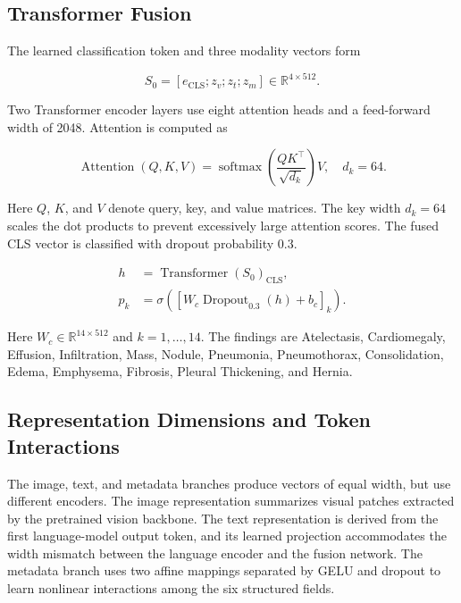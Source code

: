 \documentclass[conference,letterpaper]{IEEEtran}
\begin{document}
\subsection{Transformer Fusion}

The learned classification token and three modality vectors form

\begin{equation}
S_0=[e_{\mathrm{CLS}};z_v;z_t;z_m]
\in\mathbb{R}^{4\times512}.
\end{equation}

Two Transformer encoder layers use eight attention heads and a feed-forward width of 2048. Attention is computed as

\begin{equation}
\operatorname{Attention}(Q,K,V)=
\operatorname{softmax}
\left(\frac{QK^\top}{\sqrt{d_k}}\right)V,
\quad d_k=64.
\end{equation}

Here $Q$, $K$, and $V$ denote query, key, and value matrices. The key width $d_k=64$ scales the dot products to prevent excessively large attention scores. The fused CLS vector is classified with dropout probability 0.3.

\begin{equation}
\begin{aligned}
h &= \operatorname{Transformer}(S_0)_{\mathrm{CLS}},\\
p_k &= \sigma\!\left(
\left[W_c\operatorname{Dropout}_{0.3}(h)+b_c\right]_k
\right).
\end{aligned}
\end{equation}

Here $W_c\in\mathbb{R}^{14\times512}$ and $k=1,\ldots,14$. The findings are Atelectasis, Cardiomegaly, Effusion, Infiltration, Mass, Nodule, Pneumonia, Pneumothorax, Consolidation, Edema, Emphysema, Fibrosis, Pleural Thickening, and Hernia.

\subsection{Representation Dimensions and Token Interactions}

The image, text, and metadata branches produce vectors of equal width, but use different encoders. The image representation summarizes visual patches extracted by the pretrained vision backbone. The text representation is derived from the first language-model output token, and its learned projection accommodates the width mismatch between the language encoder and the fusion network. The metadata branch uses two affine mappings separated by GELU and dropout to learn nonlinear interactions among the six structured fields.
\end{document}
